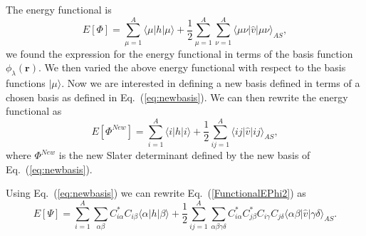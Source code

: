The energy functional is
\[
  E[\Phi] 
  = \sum_{\mu=1}^A \langle \mu | h | \mu \rangle +
  \frac{1}{2}\sum_{{\mu}=1}^A\sum_{{\nu}=1}^A \langle \mu\nu|\hat{v}|\mu\nu\rangle_{AS},
\]
we found the expression for the energy functional in terms of the basis function $\phi_{\lambda}(\mathbf{r})$. We then  varied the above energy functional with respect to the basis functions $|\mu \rangle$. 
Now we are interested in defining a new basis defined in terms of
a chosen basis as defined in Eq.~(\ref{eq:newbasis}). We can then rewrite the energy functional as
\begin{equation}
  E[\Phi^{New}] 
  = \sum_{i=1}^A \langle i | h | i \rangle +
  \frac{1}{2}\sum_{ij=1}^A\langle ij|\hat{v}|ij\rangle_{AS}, \label{FunctionalEPhi2}
\end{equation}
where $\Phi^{New}$ is the new Slater determinant defined by the new basis of Eq.~(\ref{eq:newbasis}). 

Using Eq.~(\ref{eq:newbasis}) we can rewrite Eq.~(\ref{FunctionalEPhi2}) as 
\begin{equation}
  E[\Psi] 
  = \sum_{i=1}^A \sum_{\alpha\beta} C^*_{i\alpha}C_{i\beta}\langle \alpha | h | \beta \rangle +
  \frac{1}{2}\sum_{ij=1}^A\sum_{{\alpha\beta\gamma\delta}} C^*_{i\alpha}C^*_{j\beta}C_{i\gamma}C_{j\delta}\langle \alpha\beta|\hat{v}|\gamma\delta\rangle_{AS}. \label{FunctionalEPhi3}
\end{equation}

